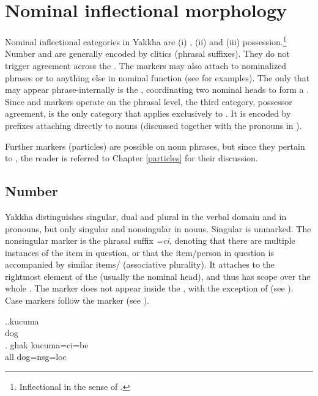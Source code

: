 \section{Nominal  inflectional morphology}\label{nom-morph}

Nominal inflectional categories in Yakkha are (i) , (ii)  and (iii) possession.\footnote{Inflectional in the sense of  \citep{Bickeletal2007Inflectional}.} Number and  are generally encoded by clitics (phrasal suffixes). They do not trigger agreement across the . The  markers may also attach to nominalized phrases or to anything else in nominal function (see  for examples). The only  that may appear phrase-internally is the  , coordinating two nominal heads to form a . Since  and  markers operate on the phrasal level, the third category, possessor agreement, is the only category that applies exclusively to . It is encoded by prefixes attaching directly to nouns (discussed together with the pronouns in ). 

Further markers (particles) are  possible on noun phrases, but since they pertain to , the reader is referred to Chapter \ref{particles} for their discussion.

\subsection{Number}\label{number}

Yakkha distinguishes singular, dual and plural in the verbal domain and in pronouns, but only singular and nonsingular in nouns. Singular  is unmarked. The nonsingular marker is the phrasal suffix \emph{=ci}, denoting that there are multiple instances of the item in question, or that the item/person in question is accompanied by similar items/ (associative plurality). It attaches to the rightmost element of the  (usually the nominal head), and thus has scope over the whole . The marker does not appear inside the , with the exception of  (see ). Case markers follow the  marker (see \Next). 
\largerpage

\ex.\ag.kucuma\\
dog\\
\bg. ghak kucuma=ci=be\\
all dog{\sc =nsg=loc}\\

